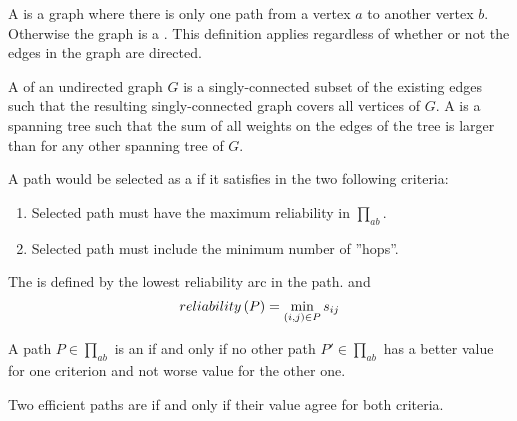 \begin{defi}
A  is a graph where there is only one path from a vertex $a$ to another vertex $b$. Otherwise the graph is a . This definition applies regardless of whether or not the edges in the graph are directed.
\cite{Barber2011}
\end{defi}

\begin{defi}
A  of an undirected graph $G$ is a singly-connected subset of the existing edges such that the resulting singly-connected graph covers all vertices of $G$. A  is a spanning tree such that the sum of all weights on the edges of the tree is larger than for any other spanning tree of $G$.
\cite{Barber2011}
\end{defi}

\begin{defi}
A path would be selected as a  if it satisfies in the two following criteria:
\begin{enumerate}
\item Selected path must have the maximum reliability in $\displaystyle\prod_{ab}$.
\item Selected path must include the minimum number of ''hops''.
\end{enumerate}
\cite{conf/fedcsis/MalucelliCR12}
\end{defi}

\begin{defi}
The  is defined by the lowest reliability arc in the path. and
\begin{equation}
reliability\left(P\right)=\displaystyle\min_{\left( i,j\right)\in P} s_{ij}
\end{equation}
\cite{conf/fedcsis/MalucelliCR12}
\end{defi}

\begin{defi}
A path $P\in\displaystyle\prod_{ab}$ is an  if and only if no other path $P'\in\displaystyle\prod_{ab}$ has a better value for one criterion and not worse value for the other one.
\cite{conf/fedcsis/MalucelliCR12}
\end{defi}

\begin{defi}
Two efficient paths are  if and only if their value agree for both criteria.
\cite{conf/fedcsis/MalucelliCR12}
\end{defi}

